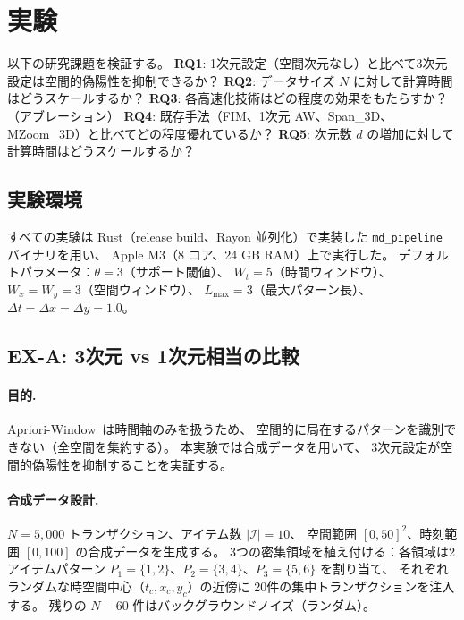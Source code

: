 \section{実験}\label{sec:experiments}

以下の研究課題を検証する。
\textbf{RQ1}: 1次元設定（空間次元なし）と比べて3次元設定は空間的偽陽性を抑制できるか？
\textbf{RQ2}: データサイズ $N$ に対して計算時間はどうスケールするか？
\textbf{RQ3}: 各高速化技術はどの程度の効果をもたらすか？（アブレーション）
\textbf{RQ4}: 既存手法（FIM、1次元 AW、Span\_3D、MZoom\_3D）と比べてどの程度優れているか？
\textbf{RQ5}: 次元数 $d$ の増加に対して計算時間はどうスケールするか？

\subsection{実験環境}

すべての実験は Rust（release build、Rayon 並列化）で実装した
\texttt{md\_pipeline} バイナリを用い、
Apple M3（8 コア、24 GB RAM）上で実行した。
デフォルトパラメータ：$\theta = 3$（サポート閾値）、
$W_t = 5$（時間ウィンドウ）、$W_x = W_y = 3$（空間ウィンドウ）、
$L_{\max} = 3$（最大パターン長）、$\Delta t = \Delta x = \Delta y = 1.0$。

\subsection{EX-A: 3次元 vs 1次元相当の比較}
\label{sec:ex_a}

\paragraph{目的.}
Apriori-Window~\cite{aprioriwindow}は時間軸のみを扱うため、
空間的に局在するパターンを識別できない（全空間を集約する）。
本実験では合成データを用いて、
3次元設定が空間的偽陽性を抑制することを実証する。

\paragraph{合成データ設計.}
$N = 5{,}000$ トランザクション、アイテム数 $|{\mathcal{I}}| = 10$、
空間範囲 $[0, 50]^2$、時刻範囲 $[0, 100]$ の合成データを生成する。
3つの密集領域を植え付ける：各領域は2アイテムパターン
$P_1 = \{1,2\}$、$P_2 = \{3,4\}$、$P_3 = \{5,6\}$ を割り当て、
それぞれランダムな時空間中心（$t_c, x_c, y_c$）の近傍に
20件の集中トランザクションを注入する。
残りの $N - 60$ 件はバックグラウンドノイズ（ランダム）。

